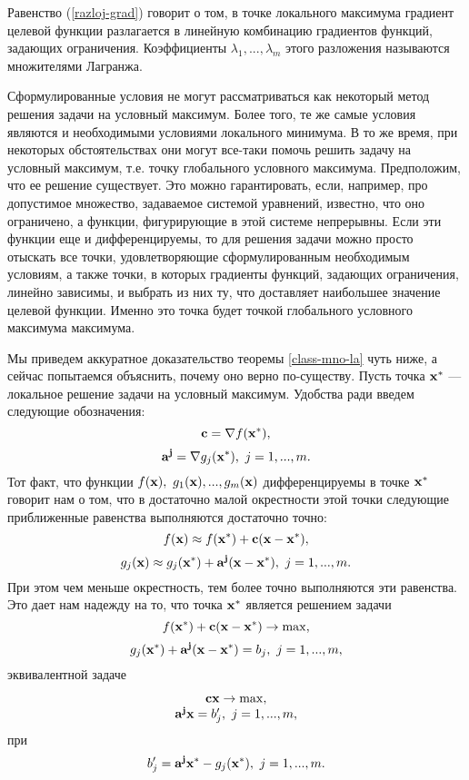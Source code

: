     Равенство (\ref{razloj-grad})
    говорит о том, в точке локального максимума градиент целевой
    функции разлагается в линейную комбинацию градиентов функций,
    задающих ограничения. Коэффициенты
    $\lambda_{1},...,\lambda_{m}$ этого разложения
    называются множителями Лагранжа.

    Сформулированные условия не могут
    рассматриваться как некоторый метод решения задачи на условный
    максимум. Более того, те же самые условия являются и необходимыми
    условиями локального минимума.
     В то же время, при некоторых обстоятельствах они могут
    все-таки помочь решить задачу на условный максимум, т.е. точку глобального
    условного максимума. Предположим,
    что ее решение существует. Это можно гарантировать, если,
    например, про допустимое множество, задаваемое системой уравнений, известно, что
    оно ограничено, а функции, фигурирующие в этой системе непрерывны.
    Если эти функции еще и дифференцируемы, то для решения задачи можно
    просто отыскать все
    точки, удовлетворяющие сформулированным необходимым условиям, а также точки,
    в которых градиенты функций, задающих ограничения, линейно
    зависимы, и выбрать из них ту,
    что доставляет наибольшее значение целевой функции. Именно это
    точка будет точкой глобального условного максимума максимума.

    Мы приведем аккуратное доказательство теоремы \ref{class-mno-la} чуть ниже, а сейчас
    попытаемся объяснить, почему оно верно по-существу. Пусть точка
    $\mathbf{x^{*}}$ --- локальное решение задачи на условный максимум.
    Удобства ради введем следующие обозначения:
    \[\mathbf{c}=\nabla f(\mathbf{x^{*}}),\]
    \[\vc{a^{j}}=\nabla g_{j}(\vc{x^{*}}), \ j=1,...,m.\]
    Тот факт, что функции
    $f(\vc{x}), \ g_{1}(\vc{x}),...,g_{m}(\vc{x})$
    дифференцируемы в точке $\mathbf{x^{*}}$ говорит нам о том, что в
    достаточно малой окрестности этой точки следующие приближенные
    равенства выполняются достаточно точно:
    \[f(\mathbf{x})\approx f(\mathbf{x^{*}})+\mathbf{c}(\mathbf{x}-\mathbf{x^{*}}),\]
    \[g_{j}(\mathbf{x})\approx g_{j}(\mathbf{x^{*}})+\mathbf{a^{j}}(\mathbf{x}-\mathbf{x^{*}}), \ j=1,...,m.\]
    При этом чем меньше окрестность, тем более точно выполняются эти
    равенства. Это дает нам надежду на то, что точка $\mathbf{x^{*}}$
    является решением задачи
    \[f(\mathbf{x^{*}})+\mathbf{c}(\mathbf{x}-\mathbf{x^{*}})\rightarrow\max,\]
    \[g_{j}(\mathbf{x^{*}})+\mathbf{a^{j}}(\mathbf{x}-\mathbf{x^{*}})=b_{j}, \ j=1,...,m,\]
    эквивалентной задаче
\begin{equation}
    \label{class-mno-la-app}
    \begin{array}{c}
        \mathbf{c}\mathbf{x}\rightarrow\max, \\
        \mathbf{a^{j}}\mathbf{x}=b_{j}', \ j=1,...,m,
      \end{array}
\end{equation}
        при
    \[b_{j}'=\vc{a^{j}}\vc{x^{*}}-g_{j}(\vc{x^{*}}), \ j=1,...,m.\]

